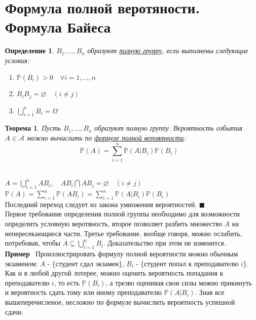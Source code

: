 \documentclass[12pt]{article}
\newtheorem{Th}{Теорема}
\newtheorem{Def}{Определение}
\newenvironment{Proof}{\par\noindent{\bf Доказательство}}{$\blacksquare$}
\newenvironment{Ex}{{\bf Пример}\ }{}
\numberwithin{Th}{section}
\numberwithin{Def}{section}
\numberwithin{Lem}{section}
\numberwithin{St}{section}
\numberwithin{equation}{section}
\newcommand\Pro{\mathbb{P}}
\newcommand\Ev{\mathscr{A}}
\begin{document}
\section{Формула полной веротяности. Формула Байеса}

\begin{Def}
$B_1, \ldots, B_n$ образуют \underline{полную группу}, если выполнены следующие условия:
	\begin{enumerate}
		\item $\Pro(B_i) > 0 \quad \forall i = 1, \ldots, n$
		\item $B_iB_j = \varnothing \quad (i \not= j)$
		\item $\bigcup\limits_{i=1}^nB_i = \Omega$
	\end{enumerate}
\end{Def}

\begin{Th}
Пусть $B_1, \ldots, B_n$ образуют полную группу. Вероятность события $A \in \Ev$ можно вычислить по \underline{формуле полной вероятности}:
$$\Pro(A) = \sum\limits_{i=1}^{n} \Pro(A|B_i)\Pro(B_i)$$
\end{Th}

\begin{Proof}
\\
$A=\bigcup\limits_{i=1}^{n}AB_i, \quad AB_i \bigcap AB_j = \varnothing \quad (i \not= j)$ \\
$\Pro(A) = \sum\limits_{i=1}^n \Pro(AB_i) = \sum\limits_{i=1}^{n} \Pro(A|B_i)\Pro(B_i)$ \\
Последний переход следует из  закона умножения вероятностей.
\end{Proof}
\\

Первое требование определения полной группы необходимо для возможности определить условную веротяность, второе позволяет 
разбить множество $A$ на непересекающиеся части. Третье требование, вообще говоря, можно ослабить, потребовав, чтобы $A \subseteq \bigcup\limits_{i=1}^nB_i$.
Доказательство при этом не изменится. \\
\begin{Ex}
Проиллюстрировать формулу полной вероятности можно обычным экзаменом: $A$ - \{студент сдал экзамен\}, $B_i$ - \{студент попал к преподавателю $i$\}.
Как и в любой другой лотерее, можно оценить вероятность попадания к преподавателю $i$, то есть $\Pro(B_i)$, а трезво оценивая свои силы можно прикинуть 
и вероятность сдать тому или иному преподавателю $\Pro(A|B_i)$. Зная все вышеперечисленое, несложно по формуле вычислить вероятность успешной сдачи.
\end{Ex}
\\
\end{document}
